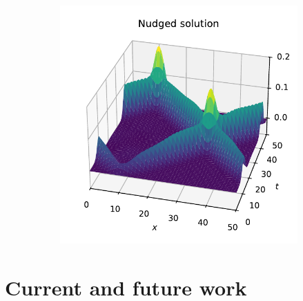 \documentclass{beamer}
\begin{document}
\begin{frame}
\begin{figure}
\begin{subfigure}{0.42\textwidth}
    \end{subfigure}
    \begin{subfigure}{0.42\textwidth}
      \centering
      \includegraphics[width=\textwidth, keepaspectratio]{wave_1d_nudged.pdf}
    \end{subfigure}
  \end{figure}
\end{frame}

\section{Current and future work}
\end{document}
